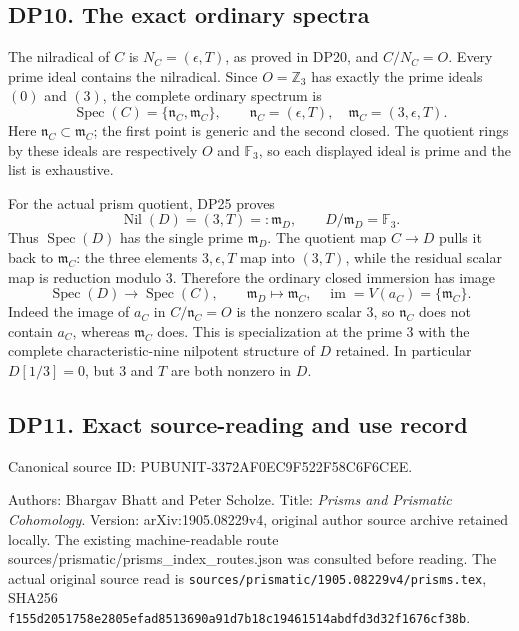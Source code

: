 \documentclass[
  10pt,
  a4paper,
]{article}
\begin{document}
\subsection{DP10. The exact ordinary
spectra}\label{dp10.-the-exact-ordinary-spectra}

The nilradical of \(C\) is \(N_C=(\epsilon,T)\), as proved in DP20, and
\(C/N_C=O\). Every prime ideal contains the nilradical. Since
\(O=\mathbb Z_3\) has exactly the prime ideals \((0)\) and \((3)\), the
complete ordinary spectrum is \[
\operatorname{Spec}(C)=\{\mathfrak n_C,\mathfrak m_C\},\qquad
\mathfrak n_C=(\epsilon,T),\quad
\mathfrak m_C=(3,\epsilon,T).
\tag{DP41}
\] Here \(\mathfrak n_C\subset\mathfrak m_C\); the first point is
generic and the second closed. The quotient rings by these ideals are
respectively \(O\) and \(\mathbb F_3\), so each displayed ideal is prime
and the list is exhaustive.

For the actual prism quotient, DP25 proves \[
\operatorname{Nil}(D)=(3,T)=:\mathfrak m_D,\qquad
D/\mathfrak m_D=\mathbb F_3.
\tag{DP42}
\] Thus \(\operatorname{Spec}(D)\) has the single prime
\(\mathfrak m_D\). The quotient map \(C\to D\) pulls it back to
\(\mathfrak m_C\): the three elements \(3,\epsilon,T\) map into
\((3,T)\), while the residual scalar map is reduction modulo 3.
Therefore the ordinary closed immersion has image \[
\operatorname{Spec}(D)\longrightarrow\operatorname{Spec}(C),\qquad
\mathfrak m_D\longmapsto\mathfrak m_C,
\quad\operatorname{im}=V(a_C)=\{\mathfrak m_C\}.
\tag{DP43}
\] Indeed the image of \(a_C\) in \(C/\mathfrak n_C=O\) is the nonzero
scalar 3, so \(\mathfrak n_C\) does not contain \(a_C\), whereas
\(\mathfrak m_C\) does. This is specialization at the prime 3 with the
complete characteristic-nine nilpotent structure of \(D\) retained. In
particular \(D[1/3]=0\), but \(3\) and \(T\) are both nonzero in \(D\).

\subsection{DP11. Exact source-reading and use
record}\label{dp11.-exact-source-reading-and-use-record}

Canonical source ID: PUBUNIT-3372AF0EC9F522F58C6F6CEE.

Authors: Bhargav Bhatt and Peter Scholze. Title: \emph{Prisms and
Prismatic Cohomology}. Version: arXiv:1905.08229v4, original author
source archive retained locally. The existing machine-readable route
sources/prismatic/prisms\_index\_routes.json was consulted before
reading. The actual original source read is
\texttt{sources/\allowbreak{}prismatic/\allowbreak{}1905.\allowbreak{}08229v4/\allowbreak{}prisms.\allowbreak{}tex}, SHA256
\texttt{f155d205\allowbreak{}1758e280\allowbreak{}5efad851\allowbreak{}3690a91d\allowbreak{}7b18c194\allowbreak{}61514abd\allowbreak{}fd3d32f1\allowbreak{}676cf38b}.
\end{document}
